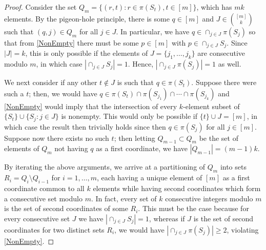 \documentclass[journal, twocolumn]{IEEEtran}
\begin{document}
\begin{proof} Consider the set $Q_m = \{ (r,t) : r \in \pi(S_t), t \in [m] \}$, which has $mk$ elements. By the pigeon-hole principle, there is some $q \in [m]$ and $J \in {[m] \choose k}$ such that $(q, j) \in Q_m$ for all $j \in J$. In particular, we have $q \in \cap_{j \in J} \pi(S_j)$ so that from \eqref{NonEmpty} there must be some $p \in [m]$ with $p \in \cap_{j \in J} S_j$. Since $|J| = k$, this is only possible if the elements of $J = \{j_1, \ldots, j_k\}$ are consecutive modulo $m$, in which case $|\cap_{j \in J} S_j| = 1$. Hence, $|\cap_{j \in J} \pi(S_j)| = 1$ as well.

We next consider if any other $t \notin J$ is such that $q \in \pi(S_t)$. Suppose there were such a $t$; then, we would have $q \in \pi(S_t) \cap \pi(S_{j_1}) \cap \cdots \cap \pi(S_{j_k})$ and \eqref{NonEmpty} would imply that the intersection of every $k$-element subset of $\{S_t\} \cup \{S_j: j \in J\}$ is nonempty. This would only be possible if $\{t\} \cup J = [m]$, in which case the result then trivially holds since then $q \in \pi(S_j)$ for all $j \in [m]$.  Suppose now there exists no such $t$; then letting $Q_{m-1} \subset Q_m$ be the set of elements of $Q_m$ not having $q$ as a first coordinate, we have $|Q_{m-1}| = (m-1)k$. 

By iterating the above arguments, we arrive at a partitioning of $Q_m$ into sets $R_i = Q_i \setminus Q_{i-1}$ for $i = 1, \ldots, m$, each having a unique element of $[m]$ as a first coordinate common to all $k$ elements while having second coordinates which form a consecutive set modulo $m$. In fact, every set of $k$ consecutive integers modulo $m$ is the set of second coordinates of some $R_i$. This must be the case because for every consecutive set $J$ we have $|\cap_{j \in J} S_j| = 1$, whereas if $J$ is the set of second coordinates for two distinct sets $R_i$, we would have $|\cap_{j \in J} \pi(S_j)| \geq 2$, violating \eqref{NonEmpty}. 
\end{proof}
\end{document}
